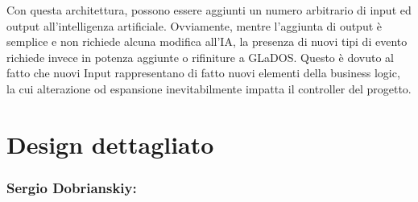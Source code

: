 \documentclass[a4paper,12pt]{report}
\begin{document}
Con questa architettura, possono essere aggiunti un numero arbitrario di input ed output
all'intelligenza artificiale.
%
Ovviamente, mentre l'aggiunta di output è semplice e non richiede alcuna modifica all'IA, la
presenza di nuovi tipi di evento richiede invece in potenza aggiunte o rifiniture a GLaDOS.
%
Questo è dovuto al fatto che nuovi Input rappresentano di fatto nuovi elementi della business
logic, la cui alterazione od espansione inevitabilmente impatta il controller del progetto.

\section{Design dettagliato}

\subsubsection*{Sergio Dobrianskiy:}
%
\end{document}
